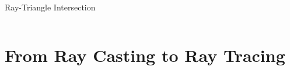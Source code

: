 \begin{frame}{Ray-Triangle Intersection}
\begin{columns}
\begin{column}{0.5\textwidth}
        \end{column}
    \end{columns}
\end{frame}

\section{From Ray Casting to Ray Tracing}


